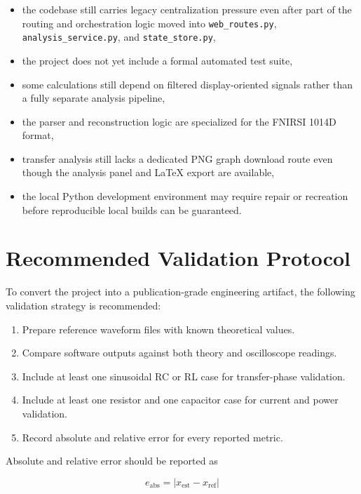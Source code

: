 \documentclass[conference]{IEEEtran}
\begin{document}
\begin{itemize}
    \item the codebase still carries legacy centralization pressure even after part of the routing and orchestration logic moved into \texttt{web\_routes.py}, \texttt{analysis\_service.py}, and \texttt{state\_store.py},
    \item the project does not yet include a formal automated test suite,
    \item some calculations still depend on filtered display-oriented signals rather than a fully separate analysis pipeline,
    \item the parser and reconstruction logic are specialized for the FNIRSI 1014D format,
    \item transfer analysis still lacks a dedicated PNG graph download route even though the analysis panel and LaTeX export are available,
    \item the local Python development environment may require repair or recreation before reproducible local builds can be guaranteed.
\end{itemize}

\section{Recommended Validation Protocol}
To convert the project into a publication-grade engineering artifact, the following validation strategy is recommended:

\begin{enumerate}
    \item Prepare reference waveform files with known theoretical values.
    \item Compare software outputs against both theory and oscilloscope readings.
    \item Include at least one sinusoidal RC or RL case for transfer-phase validation.
    \item Include at least one resistor and one capacitor case for current and power validation.
    \item Record absolute and relative error for every reported metric.
\end{enumerate}

Absolute and relative error should be reported as

\begin{equation}
e_{\mathrm{abs}} = |x_{\mathrm{est}} - x_{\mathrm{ref}}|
\end{equation}
\end{document}
